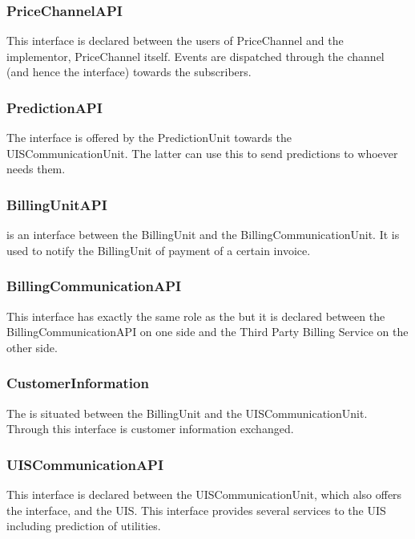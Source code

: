 \subsubsection{PriceChannelAPI}

\npar This interface is declared between the users of PriceChannel and the
implementor, PriceChannel itself. Events are dispatched through the channel
(and hence the interface) towards the subscribers.

\subsubsection{PredictionAPI}

\npar The  interface is offered by the PredictionUnit
towards the UISCommunicationUnit. The latter can use this to send predictions to
whoever needs them.

\subsubsection{BillingUnitAPI}

\npar {} is an interface between the BillingUnit and the
BillingCommunicationUnit. It is used to notify the BillingUnit of payment of a
certain invoice.

\subsubsection{BillingCommunicationAPI}

\npar This interface has exactly the same role as the 
but it is declared between the BillingCommunicationAPI on one side and the Third
Party Billing Service on the other side.

\subsubsection{CustomerInformation}

\npar The  is situated between the BillingUnit
and the UISCommunicationUnit. Through this interface is customer information
exchanged.

\subsubsection{UISCommunicationAPI}

\npar This interface is declared between the UISCommunicationUnit, which
also offers the interface, and the UIS. This interface provides several services
to the UIS including prediction of utilities.

